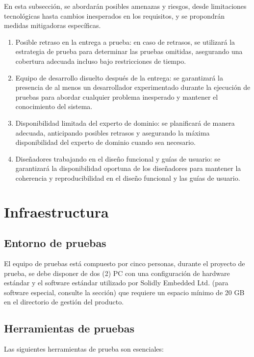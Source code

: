 \documentclass[12pt,a4paper, twoside]{article} %
\begin{document}
En esta subsección, se abordarán posibles amenazas y riesgos, desde limitaciones tecnológicas hasta cambios inesperados en los requisitos, y se propondrán medidas mitigadoras específicas.

\begin{enumerate}
  \item Posible retraso en la entrega a prueba: en caso de retrasos, se utilizará la estrategia de prueba para determinar las pruebas omitidas, asegurando una cobertura adecuada incluso bajo restricciones de tiempo.
  \item Equipo de desarrollo disuelto después de la entrega: se garantizará la presencia de al menos un desarrollador experimentado durante la ejecución de pruebas para abordar cualquier problema inesperado y mantener el conocimiento del sistema.
  \item Disponibilidad limitada del experto de dominio: se planificará de manera adecuada, anticipando posibles retrasos y asegurando la máxima disponibilidad del experto de dominio cuando sea necesario.
  \item Diseñadores trabajando en el diseño funcional y guías de usuario: se garantizará la disponibilidad oportuna de los diseñadores para mantener la coherencia y reproducibilidad en el diseño funcional y las guías de usuario.
\end{enumerate}

\section{Infraestructura}

\subsection{Entorno de pruebas}

El equipo de pruebas está compuesto por cinco personas, durante el proyecto de prueba, se debe disponer de dos (2) PC con una configuración de hardware estándar y el software estándar utilizado por Solidly Embedded Ltd. (para software especial, consulte la sección) que requiere un espacio mínimo de 20 GB en el directorio de gestión del producto.

\subsection{Herramientas de pruebas}

Las siguientes herramientas de prueba son esenciales:
\end{document}
